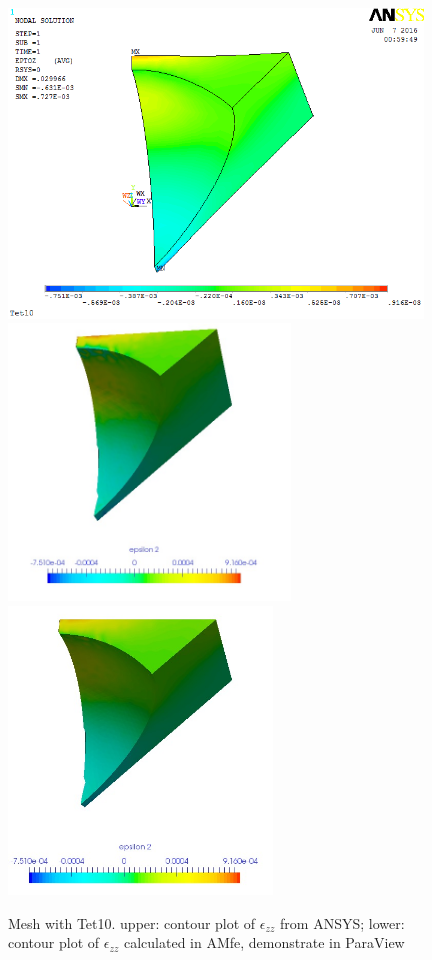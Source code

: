 \begin{figure}[htbp]
	\begin{center}
		\includegraphics[width=11cm,clip]{Tet10_Ezz.png} 
		\includegraphics[width=7.5cm,clip]{Tet10_Ezz_PD.png} 		
		\includegraphics[width=7cm,clip]{Tet10_Ezz_P.png} 		
		\caption{Mesh with Tet10. upper: contour plot of $\epsilon_{zz}$ from ANSYS; lower: contour plot of $\epsilon_{zz}$ calculated in AMfe, demonstrate in ParaView} \label{fig: Tet10_Ezz}
	\end{center}
\end{figure}
\clearpage 

